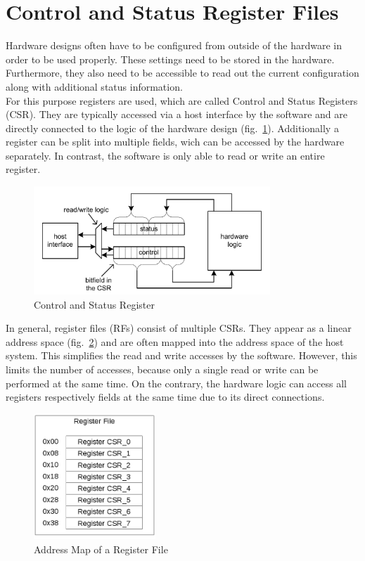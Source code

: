 \section{Control and Status Register Files}
Hardware designs often have to be configured from outside of the hardware in order to be used properly. These settings need to be stored in the hardware. Furthermore, they also need to be accessible to read out the current configuration along with additional status information.\\
For this purpose registers are used, which are called Control and Status Registers (CSR). They are typically accessed via a host interface by the software and are directly connected to the logic of the hardware design (fig.~\ref{fig::csr}). Additionally a register can be split into multiple fields, wich can be accessed by the hardware separately. In contrast, the software is only able to read or write an entire register.
\begin{figure}[h]
 \centering
 \includegraphics[width=252pt]{images/csr.png}
 \caption{Control and Status Register \cite{leber_diss}}
\label{fig::csr}
\end{figure}

In general, register files (RFs) consist of multiple CSRs. They appear as a linear address space (fig.~\ref{fig::rf}) and are often mapped into the address space of the host system. This simplifies the read and write accesses by the software. However, this limits the number of accesses, because only a single read or write can be performed at the same time. On the contrary, the hardware logic can access all registers respectively fields at the same time due to its direct connections.
\begin{figure}[h]
 \centering
 \includegraphics[width=130pt]{images/rf.png}
 \caption{Address Map of a Register File}
\label{fig::rf}
\end{figure}
